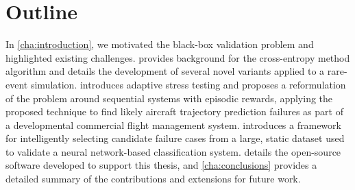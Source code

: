 \section{Outline}
In \cref{cha:introduction}, we motivated the black-box validation problem and highlighted existing challenges.
 provides background for the cross-entropy method algorithm and details the development of several novel variants applied to a rare-event simulation.
 introduces adaptive stress testing and proposes a reformulation of the problem around sequential systems with episodic rewards, applying the proposed technique to find likely aircraft trajectory prediction failures as part of a developmental commercial flight management system.
 introduces a framework for intelligently selecting candidate failure cases from a large, static dataset used to validate a neural network-based classification system.
 details the open-source software developed to support this thesis, and \cref{cha:conclusions} provides a detailed summary of the contributions and extensions for future work.
